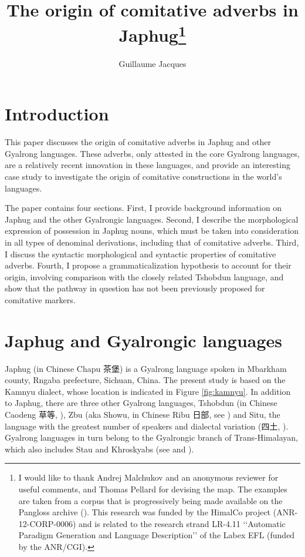 \documentclass[oldfontcommands,oneside,a4paper,11pt]{article}
\newcommand{\zh}[1]{{\cn #1}}
\begin{document}
 
 \title{The origin of comitative adverbs in Japhug\footnote{I would like to thank Andrej Malchukov and an anonymous reviewer for useful comments, and Thomas Pellard for devising the map. The examples are taken from a corpus that is progressively being made available on the Pangloss archive (\citealt{michailovsky14pangloss}). This research was funded by the HimalCo project (ANR-12-CORP-0006) and is related to the research strand LR-4.11 ‘‘Automatic Paradigm Generation and Language Description’’ of the Labex EFL (funded by the ANR/CGI). }}
 \author{Guillaume Jacques }
 \maketitle 
 
 \linenumbers 

\section*{Introduction}
This paper discusses the origin of comitative adverbs in Japhug and other Gyalrong languages. These adverbs, only attested in the core Gyalrong languages, are a relatively recent innovation in these languages, and provide an interesting case study to investigate the origin of comitative constructions in the world's languages.

The paper contains four sections.  First, I provide background information on Japhug and the other Gyalrongic languages. Second, I describe the morphological expression of possession in Japhug nouns, which must be taken into consideration in all types of denominal derivations, including that of comitative adverbs. Third, I discuss the syntactic morphological and syntactic properties of comitative adverbs. Fourth, I propose a grammaticalization hypothesis to account for their origin, involving comparison with the closely related Tshobdun language, and show that the pathway in question has not been previously proposed for comitative markers.

 \section{Japhug and Gyalrongic languages} 
Japhug (in Chinese Chapu \zh{茶堡}) is a Gyalrong language spoken in Mbarkham county, Rngaba prefecture, Sichuan, China. The present study is based on the Kamnyu dialect, whose location is indicated in Figure \ref{fig:kamnyu}. In addition to Japhug, there are three other Gyalrong languages, Tshobdun (in Chinese Caodeng \zh{草等}, \citealt{jackson03caodeng}), Zbu (aka Showu, in Chinese Ribu \zh{日部}, see \citealt{jackson04showu, gongxun14agreement}) and Situ, the language with the greatest number of speakers and dialectal variation (\zh{四土}, \citealt{linxr93jiarongen, huangsun02, prins11kyomkyo}). Gyalrong languages in turn belong to the Gyalrongic branch of Trans-Himalayan, which also includes Stau and Khroskyabs (see \citealt{jackson00puxi} and \citealt{lai15person}).
\end{document}
